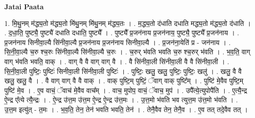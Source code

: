 \documentclass[17pt]{extarticle}
\begin{document}
\textbf{Jatai Paata} \newline

1. मि॒थु॒नम् म॑द्ध्य॒तो म॑द्ध्य॒तो मि॑थु॒नम् मि॑थु॒नम् म॑द्ध्य॒तः । . म॒द्ध्य॒तो द॑धाति दधाति मद्ध्य॒तो म॑द्ध्य॒तो द॑धाति । . द॒धा॒ति॒ पुष्ट्यै॒ पुष्ट्यै॑ दधाति दधाति॒ पुष्ट्यै᳚ । . पुष्ट्यै᳚ प्र॒जन॑नाय प्र॒जन॑नाय॒ पुष्ट्यै॒ पुष्ट्यै᳚ प्र॒जन॑नाय । . प्र॒जन॑नाय सिनीवा॒ल्यै सि॑नीवा॒ल्यै प्र॒जन॑नाय प्र॒जन॑नाय सिनीवा॒ल्यै । . प्र॒जन॑ना॒येति॑ प्र - जन॑नाय । . सि॒नी॒वा॒ल्यै च॒रु श्च॒रुः सि॑नीवा॒ल्यै सि॑नीवा॒ल्यै च॒रुः । . च॒रुर् भ॑वति भवति च॒रु श्च॒रुर् भ॑वति । . भ॒व॒ति॒ वाग् वाग् भ॑वति भवति॒ वाक् । . वाग् वै वै वाग् वाग् वै । . वै सि॑नीवा॒ली सि॑नीवा॒ली वै वै सि॑नीवा॒ली । . सि॒नी॒वा॒ली पुष्टिः॒ पुष्टिः॑ सिनीवा॒ली सि॑नीवा॒ली पुष्टिः॑ । . पुष्टिः॒ खलु॒ खलु॒ पुष्टिः॒ पुष्टिः॒ खलु॑ । . खलु॒ वै वै खलु॒ खलु॒ वै । . वै वाग् वाग् वै वै वाक् । . वाक् पुष्टि॒म् पुष्टिं॒ ॅवाग् वाक् पुष्टि᳚म् । . पुष्टि॑ मे॒वैव पुष्टि॒म् पुष्टि॑ मे॒व । . ए॒व वाचं॒ ॅवाच॑ मे॒वैव वाच᳚म् । . वाच॒ मुपोप॒ वाचं॒ ॅवाच॒ मुप॑ । . उपै᳚त्ये॒त्युपोपै॑ति । . ए॒त्यै॒न्द्र ऐ॒न्द्र ए᳚त्ये त्यै॒न्द्रः । . ऐ॒न्द्र उ॑त्त॒म उ॑त्त॒म ऐ॒न्द्र ऐ॒न्द्र उ॑त्त॒मः । . उ॒त्त॒मो भ॑वति भव त्युत्त॒म उ॑त्त॒मो भ॑वति । . उ॒त्त॒म इत्यु॑त् - त॒मः । . भ॒व॒ति॒ तेन॒ तेन॑ भवति भवति॒ तेन॑ । . तेनै॒वैव तेन॒ तेनै॒व । . ए॒व तत् तदे॒वैव तत् । \newline
\end{document}
